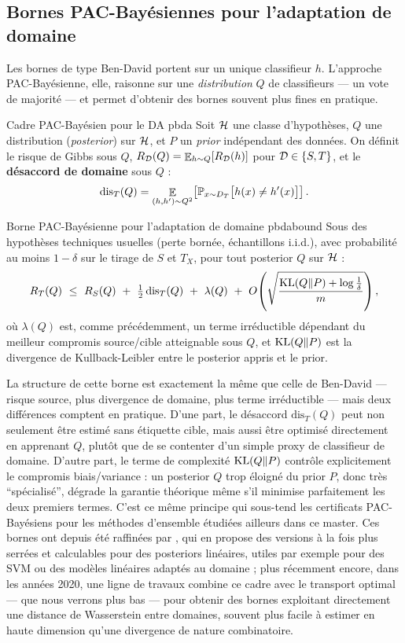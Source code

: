 \documentclass[11pt]{article}
\begin{document}
\subsection{Bornes PAC-Bayésiennes pour l'adaptation de domaine}

Les bornes de type Ben-David portent sur un unique classifieur $h$. L'approche PAC-Bayésienne, elle,
raisonne sur une \emph{distribution} $Q$ de classifieurs --- un vote de majorité --- et permet d'obtenir
des bornes souvent plus fines en pratique.

\begin{definition}{Cadre PAC-Bayésien pour le DA \citep{germain2013pacbayesian}}{pbda}
Soit $\mathcal{H}$ une classe d'hypothèses, $Q$ une distribution (\emph{posterior}) sur $\mathcal{H}$, et $P$ un
\emph{prior} indépendant des données. On définit le risque de Gibbs sous $Q$,
$R_{\mathcal{D}}(Q) = \mathop{\mathbb{E}}_{h\sim Q}\!\left[R_{\mathcal{D}}(h)\right]$ pour $\mathcal{D}\in\{S,T\}$, et le \textbf{désaccord de domaine} sous $Q$ :
\[
\mathrm{dis}_T(Q) = \mathop{\mathbb{E}}_{(h,h')\sim Q^2}\!\left[\mathbb{P}_{x\sim D_T}\big[h(x)\neq h'(x)\big]\right].
\]
\end{definition}

\begin{theorem}{Borne PAC-Bayésienne pour l'adaptation de domaine \citep{germain2013pacbayesian,germain2016new}}{pbdabound}
Sous des hypothèses techniques usuelles (perte bornée, échantillons i.i.d.), avec probabilité au moins
$1-\delta$ sur le tirage de $S$ et $T_X$, pour tout posterior $Q$ sur $\mathcal{H}$ :
\[
R_T(Q) \ \le\ R_S(Q) \ + \ \tfrac12\, \mathrm{dis}_T(Q) \ + \ \lambda(Q)
\ + \ O\!\left(\sqrt{\frac{\operatorname{KL}(Q\|P) + \log\frac1\delta}{m}}\right),
\]
où $\lambda(Q)$ est, comme précédemment, un terme irréductible dépendant du meilleur compromis
source/cible atteignable sous $Q$, et $\operatorname{KL}(Q\|P)$ est la divergence de Kullback-Leibler entre le
posterior appris et le prior.
\end{theorem}

La structure de cette borne est exactement la même que celle de Ben-David --- risque source, plus
divergence de domaine, plus terme irréductible --- mais deux différences comptent en pratique. D'une
part, le désaccord $\mathrm{dis}_T(Q)$ peut non seulement être estimé sans étiquette cible, mais aussi
être optimisé directement en apprenant $Q$, plutôt que de se contenter d'un simple proxy de classifieur
de domaine. D'autre part, le terme de complexité $\operatorname{KL}(Q\|P)$ contrôle explicitement le compromis
biais/variance : un posterior $Q$ trop éloigné du prior $P$, donc très \enquote{spécialisé}, dégrade la
garantie théorique même s'il minimise parfaitement les deux premiers termes. C'est ce même principe qui
sous-tend les certificats PAC-Bayésiens pour les méthodes d'ensemble étudiées ailleurs dans ce master.
Ces bornes ont depuis été raffinées par \citet{germain2016new}, qui en propose des versions à la fois
plus serrées et calculables pour des posteriors linéaires, utiles par exemple pour des SVM ou des modèles
linéaires adaptés au domaine ; plus récemment encore, dans les années 2020, une ligne de travaux combine
ce cadre avec le transport optimal --- que nous verrons plus bas --- pour obtenir des bornes exploitant
directement une distance de Wasserstein entre domaines, souvent plus facile à estimer en haute dimension
qu'une divergence de nature combinatoire.
\end{document}
